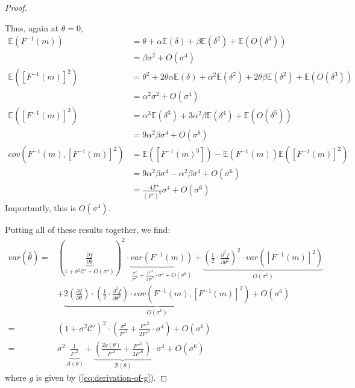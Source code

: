 \begin{proof}
\begin{itemize}
    Thus, again at $\theta=0$,
    \begin{align*}
        \mathbb{E}(F^{-1}(m)) &= \theta + \alpha\mathbb{E}(\delta) + \beta\mathbb{E}(\delta^2) + \mathbb{E}(O(\delta^3))\\
        &= \beta \sigma^2 + O(\sigma^4) \\
        \mathbb{E}([F^{-1}(m)]^2) &= \theta^2 + 2\theta \alpha \mathbb{E}(\delta) + \alpha^2\mathbb{E}(\delta^2)+    2 \theta \beta \mathbb{E}(\delta^2) + \mathbb{E}(O(\delta^3))\\
        &= \alpha^2\sigma^2 + O(\sigma^4) \\
        \mathbb{E}([F^{-1}(m)]^3) &= \alpha^3\mathbb{E}(\delta^3) + 3\alpha^2\beta\mathbb{E}(\delta^4)+\mathbb{E}(O(\delta^5))\\
        &= 9\alpha^2\beta\sigma^4 + O(\sigma^6)\\
        cov(F^{-1}(m),[F^{-1}(m)]^2) &= \mathbb{E}([F^{-1}(m)^3]) - \mathbb{E}(F^{-1}(m))\mathbb{E}([F^{-1}(m)]^2)\\
        &= 9\alpha^2\beta\sigma^4 - \alpha^2\beta \sigma^4 + O(\sigma^6)\\
        &= \frac{-4F''}{(F')^5}\sigma^4 + O(\sigma^6)
    \end{align*}
    Importantly, this is $O(\sigma^4)$.

\end{itemize}
Putting all of these results together, we find:
\begin{align*}
var(\widehat{\theta}) 
    =& \left(\underbrace{\frac{\partial f}{\partial \theta}}_{1 + \sigma^2\mathcal{C}' + O(\sigma^4)}\right)^2 \cdot \underbrace{var(F^{-1}(m))}_{\frac{\sigma^2}{F'^2}+\frac{F''^2}{2F'^6}\cdot\sigma^4 + O(\sigma^6)} + \underbrace{\left(\frac{1}{2} \cdot \frac{\partial^2 f}{\partial \theta^2}\right)^2 \cdot var\left([F^{-1}(m)]^2\right)}_{O(\sigma^6)}\\
    & + \underbrace{2\left(\frac{\partial f}{\partial \theta}\right) \cdot \left(\frac{1}{2} \cdot \frac{\partial^2 f}{\partial \theta^2}\right) \cdot cov\left(F^{-1}(m), [F^{-1}(m)]^2\right)}_{O(\sigma^6)} + O(\sigma^6) \\
    =& \left(1 + \sigma^2\mathcal{C}'\right)^2 \cdot \left(\frac{\sigma^2}{F'^2}+\frac{F''^2}{2F'^6}\cdot\sigma^4\right) + O(\sigma^6) \\
    =& \sigma^2 \underbrace{\frac{1}{F'^2}}_{ \mathcal{A}(\theta)} + \underbrace{\left(\frac{2g(\theta)}{F'^2} + \frac{F''^2}{2F'^6}\right)}_{\mathcal{B}(\theta)} \cdot \sigma^4 + O(\sigma^6)
\end{align*}
where $g$ is given by (\ref{eq:derivation-of-g}).

    
\end{proof}




